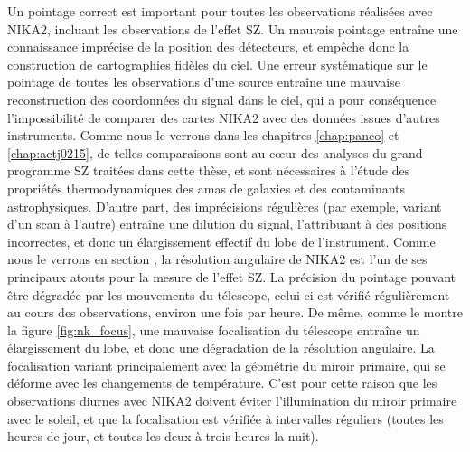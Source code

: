 Un pointage correct est important pour toutes les observations réalisées avec NIKA2, incluant les observations de l'effet SZ.
Un mauvais pointage entraîne une connaissance imprécise de la position des détecteurs, et empêche donc la construction de cartographies fidèles du ciel.
Une erreur systématique sur le pointage de toutes les observations d'une source entraîne une mauvaise reconstruction des coordonnées du signal dans le ciel, qui a pour conséquence l'impossibilité de comparer des cartes NIKA2 avec des données issues d'autres instruments.
Comme nous le verrons dans les chapitres \ref{chap:panco} et \ref{chap:actj0215}, de telles comparaisons sont au cœur des analyses du grand programme SZ traitées dans cette thèse, et sont nécessaires à l'étude des propriétés thermodynamiques des amas de galaxies et des contaminants astrophysiques.
D'autre part, des imprécisions régulières (par exemple, variant d'un scan à l'autre) entraîne une dilution du signal, l'attribuant à des positions incorrectes, et donc un élargissement effectif du lobe de l'instrument.
Comme nous le verrons en section , la résolution angulaire de NIKA2 est l'un de ses principaux atouts pour la mesure de l'effet SZ.
La précision du pointage pouvant être dégradée par les mouvements du télescope, celui-ci est vérifié régulièrement au cours des observations, environ une fois par heure.
De même, comme le montre la figure \ref{fig:nk_focus}, une mauvaise focalisation du télescope entraîne un élargissement du lobe, et donc une dégradation de la résolution angulaire.
La focalisation variant principalement avec la géométrie du miroir primaire, qui se déforme avec les changements de température.
C'est pour cette raison que les observations diurnes avec NIKA2 doivent éviter l'illumination du miroir primaire avec le soleil, et que la focalisation est vérifiée à intervalles réguliers (toutes les heures de jour, et toutes les deux à trois heures la nuit).

